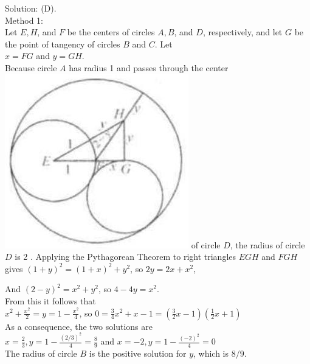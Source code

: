 \documentclass{article}
\begin{document}
Solution: (D).\\
Method 1:\\
Let \(E, H\), and \(F\) be the centers of circles \(A, B\), and \(D\), respectively, and let \(G\) be the point of tangency of circles \(B\) and \(C\). Let\\
\(x=F G\) and \(y=G H\).\\
Because circle \(A\) has radius 1 and passes through the center\\
\includegraphics[width=\textwidth]{images/180(2).jpg} of circle \(D\), the radius of circle \(D\) is 2 . Applying the Pythagorean Theorem to right triangles \(E G H\) and \(F G H\) gives \((1+y)^{2}=(1+x)^{2}+y^{2}\), so \(2 y=2 x+x^{2}\),


And \((2-y)^{2}=x^{2}+y^{2}\), so \(4-4 y=x^{2}\).\\
From this it follows that\\
\(x^{2}+\frac{x^{2}}{2}=y=1-\frac{x^{2}}{4}\), so \(0=\frac{3}{4} x^{2}+x-1=\left(\frac{3}{2} x-1\right)\left(\frac{1}{2} x+1\right)\)\\
As a consequence, the two solutions are\\
\(x=\frac{2}{3}, y=1-\frac{(2 / 3)^{2}}{4}=\frac{8}{9}\) and \(x=-2, y=1-\frac{(-2)^{2}}{4}=0\)\\
The radius of circle \(B\) is the positive solution for \(y\), which is \(8 / 9\).
\end{document}
